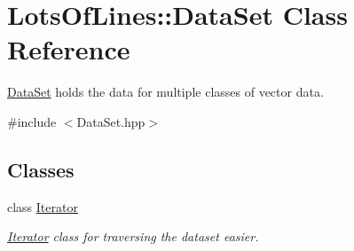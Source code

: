 \hypertarget{class_lots_of_lines_1_1_data_set}{}\section{Lots\+Of\+Lines\+:\+:Data\+Set Class Reference}
\label{class_lots_of_lines_1_1_data_set}


\hyperlink{class_lots_of_lines_1_1_data_set}{Data\+Set} holds the data for multiple classes of vector data.  




{\ttfamily \#include $<$Data\+Set.\+hpp$>$}

\subsection*{Classes}
\begin{DoxyCompactItemize}
\item 
class \hyperlink{class_lots_of_lines_1_1_data_set_1_1_iterator}{Iterator}
\begin{DoxyCompactList}\small\item\em \hyperlink{class_lots_of_lines_1_1_data_set_1_1_iterator}{Iterator} class for traversing the dataset easier. \end{DoxyCompactList}\end{DoxyCompactItemize}
